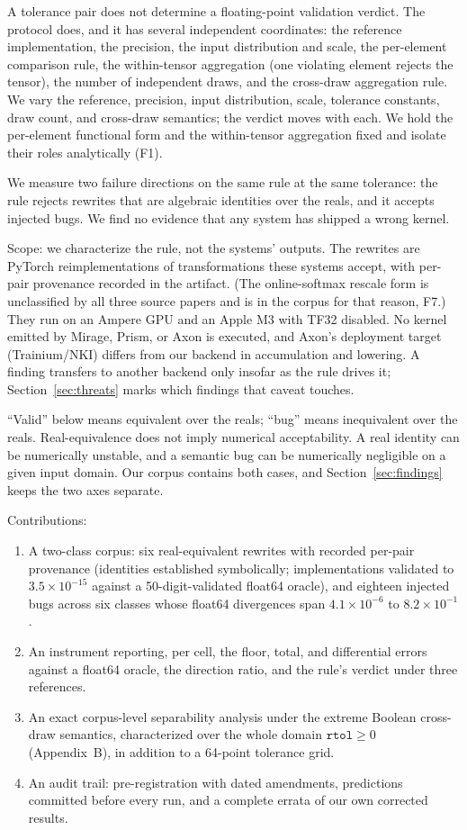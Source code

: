 \documentclass[twocolumn,10pt]{article}
\newcommand{\rtol}{\texttt{rtol}}
\newcommand{\e}[2]{$#1\times10^{#2}$}
\begin{document}
A tolerance pair does not determine a floating-point validation verdict.
The protocol does, and it has several independent coordinates: the
reference implementation, the precision, the input distribution and
scale, the per-element comparison rule, the within-tensor aggregation
(one violating element rejects the tensor), the number of independent
draws, and the cross-draw aggregation rule. We vary the reference,
precision, input distribution, scale, tolerance constants, draw count,
and cross-draw semantics; the verdict moves with each. We hold the
per-element functional form and the within-tensor aggregation fixed and
isolate their roles analytically (F1).

We measure two failure directions on the same rule at the same
tolerance: the rule rejects rewrites that are algebraic identities over
the reals, and it accepts injected bugs. We find no evidence that any
system has shipped a wrong kernel.

Scope: we characterize the rule, not the systems' outputs. The rewrites
are PyTorch reimplementations of transformations these systems accept,
with per-pair provenance recorded in the artifact. (The online-softmax
rescale form is unclassified by all three source papers and is in the
corpus for that reason, F7.) They run on an Ampere GPU and an Apple M3
with TF32 disabled. No kernel emitted by Mirage, Prism, or Axon is
executed, and Axon's deployment target (Trainium/NKI) differs from our
backend in accumulation and lowering. A finding transfers to another
backend only insofar as the rule drives it;
Section~\ref{sec:threats} marks which findings that caveat touches.

``Valid'' below means equivalent over the reals; ``bug'' means
inequivalent over the reals. Real-equivalence does not imply numerical
acceptability. A real identity can be numerically unstable, and a
semantic bug can be numerically negligible on a given input domain. Our
corpus contains both cases, and Section~\ref{sec:findings} keeps the two
axes separate.

Contributions:
\begin{enumerate}
\item A two-class corpus: six real-equivalent rewrites with recorded
per-pair provenance (identities established symbolically;
implementations validated to \e{3.5}{-15} against a 50-digit-validated
float64 oracle), and eighteen injected bugs across six classes whose
float64 divergences span \e{4.1}{-6} to \e{8.2}{-1}.
\item An instrument reporting, per cell, the floor, total, and
differential errors against a float64 oracle, the direction ratio, and
the rule's verdict under three references.
\item An exact corpus-level separability analysis under the extreme
Boolean cross-draw semantics, characterized over the whole domain
$\rtol\ge0$ (Appendix~B), in addition to a 64-point tolerance grid.
\item An audit trail: pre-registration with dated amendments,
predictions committed before every run, and a complete errata of our
own corrected results.
\end{enumerate}
\end{document}
